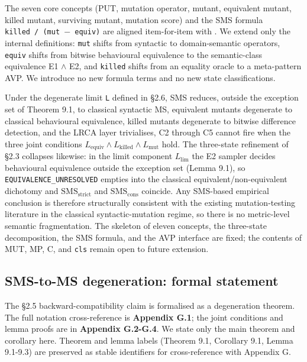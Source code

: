 \documentclass[manuscript,screen,review]{acmart}
\begin{document}
The seven core concepts (PUT, mutation operator, mutant, equivalent
mutant, killed mutant, surviving mutant, mutation score) and the SMS
formula
\texttt{\textbar{}killed\textbar{}\ /\ (\textbar{}mut\textbar{}\ $-$\ \textbar{}equiv\textbar{})}
are aligned item-for-item with \citet{d7c38286734419b52de4262c9802ebdfcf4b9447}. We extend only the
internal definitions: \texttt{mut} shifts from syntactic to
domain-semantic operators, \texttt{equiv} shifts from bitwise
behavioural equivalence to the semantic-class equivalence E1 $\wedge$ E2, and
\texttt{killed} shifts from an equality oracle to a meta-pattern AVP. We
introduce no new formula terms and no new state classifications.

Under the degenerate limit \texttt{L} defined in §2.6, SMS reduces,
outside the exception set of Theorem 9.1, to classical syntactic MS,
equivalent mutants degenerate to classical behavioural equivalence,
killed mutants degenerate to bitwise difference detection, and the LRCA
layer trivialises, C2 through C5 cannot fire when the three joint
conditions $L_{\mathrm{equiv}} \wedge L_{\mathrm{killed}} \wedge
L_{\mathrm{mut}}$ hold. The three-state refinement of §2.3 collapses
likewise: in the limit component $L_{\mathrm{lim}}$ the E2 sampler
decides behavioural equivalence outside the exception set (Lemma 9.1),
so \texttt{EQUIVALENCE\_UNRESOLVED} empties into the classical
equivalent/non-equivalent dichotomy and $\mathrm{SMS}_{\mathrm{strict}}$
and $\mathrm{SMS}_{\mathrm{cons}}$ coincide. Any
SMS-based empirical conclusion is therefore structurally consistent with
the existing mutation-testing literature in the classical
syntactic-mutation regime, so there is no metric-level semantic
fragmentation. The skeleton of eleven concepts, the three-state
decomposition, the SMS formula, and the AVP interface are fixed; the
contents of MUT, MP, C, and \texttt{cls} remain open to future
extension.

\subsection{SMS-to-MS degeneration: formal statement}\label{sms-ms-degeneration-formal-statement}

The §2.5 backward-compatibility claim is formalised as a degeneration
theorem. The full notation cross-reference is \textbf{Appendix G.1}; the
joint conditions and lemma proofs are in \textbf{Appendix G.2-G.4}. We
state only the main theorem and corollary here. Theorem and lemma labels
(Theorem 9.1, Corollary 9.1, Lemma 9.1-9.3) are preserved as stable
identifiers for cross-reference with Appendix G.
\end{document}
